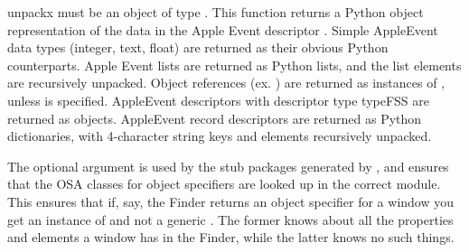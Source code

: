 \begin{funcdesc}{unpack}{x}
   must be an object of type . This function
  returns a Python object representation of the data in the Apple
  Event descriptor . Simple AppleEvent data types (integer,
  text, float) are returned as their obvious Python counterparts.
  Apple Event lists are returned as Python lists, and the list
  elements are recursively unpacked.  Object references
  (ex. ) are returned as instances of
  , unless 
  is specified.  AppleEvent descriptors with
  descriptor type typeFSS are returned as 
  objects.  AppleEvent record descriptors are returned as Python
  dictionaries, with 4-character string keys and elements recursively
  unpacked.
  
  The optional  argument is used by the stub packages
  generated by , and ensures that the OSA classes
  for object specifiers are looked up in the correct module. This ensures
  that if, say, the Finder returns an object specifier for a window
  you get an instance of  and not a generic
  . The former knows about all the properties
  and elements a window has in the Finder, while the latter knows
  no such things.
\end{funcdesc}


\begin{seealso}
\end{seealso}
